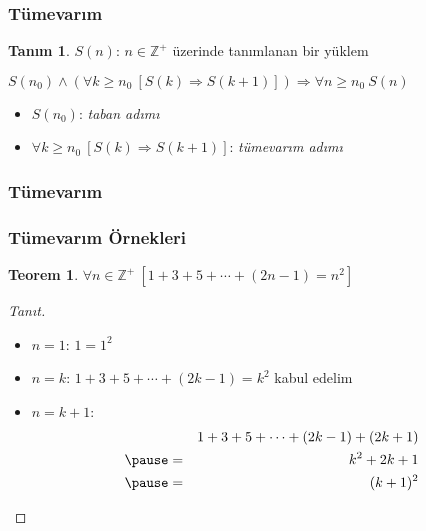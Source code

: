 \documentclass[dvipsnames]{beamer}
\theoremstyle{definition}
\newtheorem{tanim}[theorem]{Tanım}
\theoremstyle{example}
\theoremstyle{plain}
\newtheorem{teorem}[theorem]{Teorem}
\begin{document}
\begin{frame}
  \frametitle{Tümevarım}

  \begin{tanim}
    $S(n)$: $n \in \mathbb{Z}^+$ üzerinde tanımlanan bir yüklem

    \pause
    \medskip
    $S(n_0) \wedge (\forall k \geq n_0~[S(k) \Rightarrow S(k+1)])
      \Rightarrow \forall n \geq n_0~S(n)$
  \end{tanim}

  \pause
  \medskip
  \begin{itemize}
    \item $S(n_0)$: \emph{taban adımı}
    \item $\forall k \geq n_0~[S(k) \Rightarrow S(k+1)]$: \emph{tümevarım adımı}
  \end{itemize}
\end{frame}

\begin{frame}
  \frametitle{Tümevarım}

  \begin{center}
  \end{center}
\end{frame}

\begin{frame}
  \frametitle{Tümevarım Örnekleri}

  \begin{teorem}
    $\forall n \in \mathbb{Z}^+~[1+3+5+\cdots+(2n-1)=n^2]$
  \end{teorem}

  \pause
  \begin{proof}[Tanıt]
    \begin{itemize}
      \item $n=1$: $1=1^2$

      \pause
      \item $n=k$: $1+3+5+\cdots+(2k-1)=k^2$ kabul edelim

      \pause
      \item $n=k+1$:
      \begin{eqnarray*}
        &   & 1+3+5+\cdots+(2k-1)+(2k+1)\\\pause
        & = & k^2+2k+1\\\pause
        & = & (k+1)^2
      \end{eqnarray*}
    \end{itemize}
  \end{proof}
\end{frame}
\end{document}
